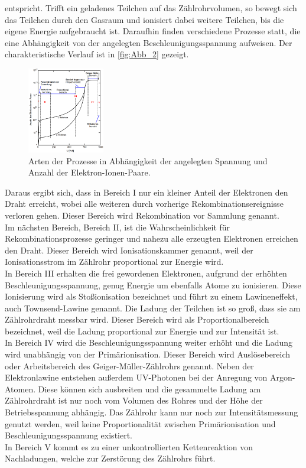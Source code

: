 entspricht.
Trifft ein geladenes Teilchen auf das Zählrohrvolumen, so bewegt sich das Teilchen 
durch den Gasraum und ionisiert dabei weitere Teilchen, bis die eigene Energie 
aufgebraucht ist. Daraufhin finden verschiedene Prozesse statt, die eine Abhängigkeit
von der angelegten Beschleunigungsspannung aufweisen. Der charakteristische Verlauf ist
in \autoref{fig:Abb_2} gezeigt.
\begin{figure}[H]
    \centering
    \includegraphics[width=0.3\textwidth]{Abbildungen/Abb_2.png}
    \caption{Arten der Prozesse in Abhängigkeit der angelegten Spannung und Anzahl der Elektron-Ionen-Paare.\cite{V703}}
    \label{fig:Abb_2}
\end{figure}
Daraus ergibt sich, dass in Bereich I nur ein kleiner Anteil der Elektronen den Draht erreicht,
wobei alle weiteren durch vorherige Rekombinationsereignisse verloren gehen. Dieser Bereich wird
Rekombination vor Sammlung genannt. \\
Im nächsten Bereich, Bereich II, ist die Wahrscheinlichkeit für Rekombinationsprozesse geringer und 
nahezu alle erzeugten Elektronen erreichen den Draht. Dieser Bereich wird Ionisationskammer
genannt, weil der Ionisationsstrom im Zählrohr proportional zur Energie wird.\\
In Bereich III erhalten die frei gewordenen Elektronen, aufgrund der erhöhten Beschleunigungsspannung,
genug Energie um ebenfalls Atome zu ionisieren. Diese Ionisierung wird als Stoßionisation
bezeichnet und führt zu einem Lawineneffekt, auch Townsend-Lawine genannt.
Die Ladung der Teilchen ist so groß, dass sie am Zählrohrdraht messbar wird.
Dieser Bereich wird als Proportionalbereich bezeichnet, weil die Ladung proportional zur Energie 
und zur Intensität ist.\\
In Bereich IV wird die Beschleunigungsspannung weiter erhöht und die Ladung wird unabhängig von der
Primärionisation. Dieser Bereich wird Auslösebereich oder Arbeitsbereich des Geiger-Müller-Zählrohrs
genannt.
Neben der Elektronlawine entstehen außerdem UV-Photonen bei der Anregung von Argon-Atomen.
Diese können sich ausbreiten und die gesammelte Ladung am Zählrohrdraht ist nur noch vom Volumen
des Rohres und der Höhe der Betriebsspannung abhängig. 
Das Zählrohr kann nur noch zur Intensitätsmessung genutzt werden, weil keine Proportionalität zwischen 
Primärionisation und Beschleunigungsspannung existiert.\\
In Bereich V kommt es zu einer unkontrollierten Kettenreaktion von Nachladungen, welche zur Zerstörung des
Zählrohrs führt.

